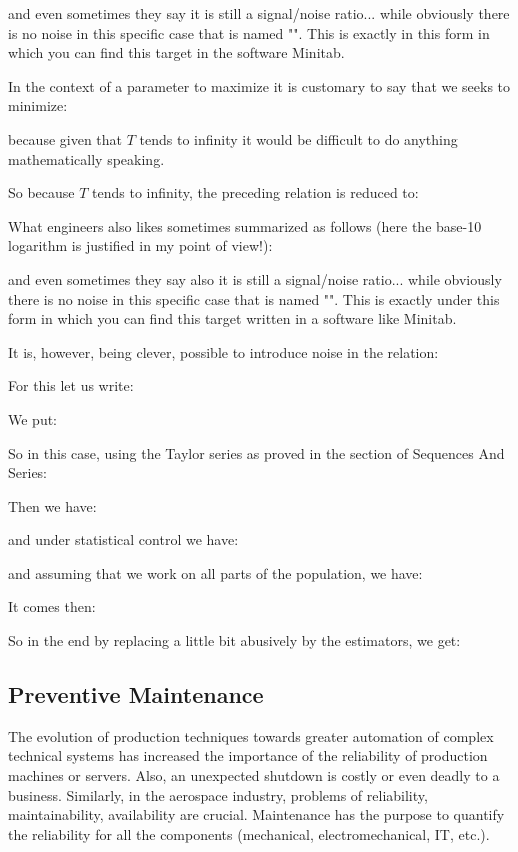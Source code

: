 	and even sometimes they say it is still a signal/noise ratio... while obviously there is no noise in this specific case that is named "". This is exactly in this form in which you can find this target in the software Minitab.
	
	In the context of a parameter to maximize it is customary to say that we seeks to minimize:
	
	because given that $T$ tends to infinity it would be difficult to do anything mathematically speaking.
	
	So because $T$ tends to infinity, the preceding relation is reduced to:
	
	What engineers also likes sometimes summarized as follows (here the base-10 logarithm is justified in my point of view!):
	
	and even sometimes they say also it is still a signal/noise ratio... while obviously there is no noise in this specific case that is named "". This is exactly  under this form in which you can find this target written in a software like Minitab.
	
	It is, however, being clever, possible to introduce noise in the relation:
	
	For this let us write:
	
	We put:
	
	So in this case, using the Taylor series as proved in the section of Sequences And Series:
	
	Then we have:
	
	and under statistical control we have:
	
	and assuming that we work on all parts of the population, we have:
	
	It comes then:
	
	So in the end by replacing a little bit abusively by the estimators, we get:
	
	
	\pagebreak
	\subsection{Preventive Maintenance}
	The evolution of production techniques towards greater automation of complex technical systems has increased the importance of the reliability of production machines or servers. Also, an unexpected shutdown is costly or even deadly to a business. Similarly, in the aerospace industry, problems of reliability, maintainability, availability are crucial. Maintenance has the purpose to quantify the reliability for all the components (mechanical, electromechanical, IT, etc.).
	
